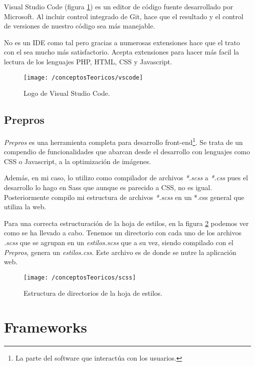 Visual Studio Code (figura \ref{fig:vscode}) es un editor de código fuente desarrollado por Microsoft. Al incluir control integrado de Git, hace que el resultado y el control de versiones de nuestro código sea más manejable.

No es un IDE como tal pero gracias a numerosas extensiones hace que el trato con el sea mucho más satisfactorio. Acepta extensiones para hacer más facil la lectura de los lenguajes PHP, HTML, CSS y Javascript. 

\begin{figure}[ht]
	\centering
	\texttt{[image: /conceptosTeoricos/vscode]}
	\caption{Logo de Visual Studio Code.}
	\label{fig:vscode}
\end{figure}

\subsection{Prepros}

\textit{Prepros} es una herramienta completa para desarrollo front-end\footnote{La parte del software que interactúa con los usuarios.}. Se trata de un compendio de funcionalidades que abarcan desde el desarrollo con lenguajes como CSS o Javascript, a la optimización de imágenes.

Además, en mi caso, lo utilizo como compilador de archivos \textit{*.scss} a \textit{*.css} pues el desarrollo lo hago en Sass que aunque es parecido a CSS, no es igual. Posteriormente compilo mi estructura de archivos \textit{*.scss} en un *.css general que utiliza la web.

Para una correcta estructuración de la hoja de estilos, en la figura \ref{fig:scss} podemos ver como se ha llevado a cabo.
Tenemos un directorio con cada uno de los archivos \textit{.scss} que se agrupan en un \textit{estilos.scss} que a su vez, siendo compilado con el \textit{Prepros}, genera un \textit{estilos.css}. Este archivo es de donde se nutre la aplicación web.

\begin{figure}[ht]
	\centering
	\texttt{[image: /conceptosTeoricos/scss]}
	\caption{Estructura de directorios de la hoja de estilos.}
	\label{fig:scss}
\end{figure}

\newpage

\section{Frameworks }

